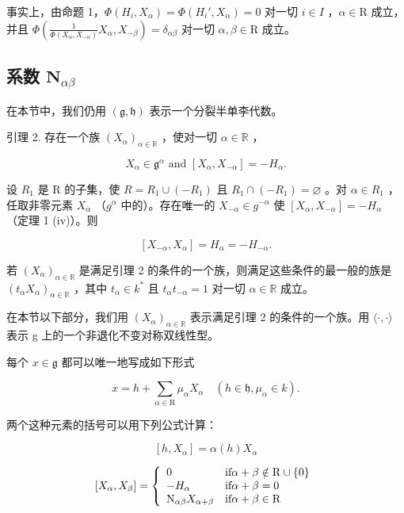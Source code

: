 事实上，由命题 1，\(\Phi(H_i, X_\alpha) = \Phi(H_i', X_\alpha) = 0\) 对一切 \(i \in I\) ，\(\alpha \in \mathrm{R}\) 成立，并且 \(\Phi\left(\frac{1}{\Phi(X_\alpha, X_{-\alpha})} X_\alpha, X_{-\beta}\right) = \delta_{\alpha\beta}\) 对一切 \(\alpha, \beta \in \mathrm{R}\) 成立。

\subsection{\texorpdfstring{系数 \(\mathbf{N}_{\alpha \beta}\)}{系数 \textbackslash mathbf\{N\}\_\{\textbackslash alpha \textbackslash beta\}}}

在本节中，我们仍用 \((\mathfrak{g},\mathfrak{h})\) 表示一个分裂半单李代数。

引理 2. 存在一个族 \((X_{\alpha})_{\alpha \in \mathbb{R}}\) ，使对一切 \(\alpha \in \mathbb{R}\) ，

\[
X _ {\alpha} \in \mathfrak {g} ^ {\alpha} \text { and } [ X _ {\alpha}, X _ {- \alpha} ] = - H _ {\alpha}.
\]

设 \(R_{1}\) 是 R 的子集，使 \(R = R_{1} \cup (-R_{1})\) 且 \(R_{1} \cap (-R_{1}) = \varnothing\) 。对 \(\alpha \in R_{1}\) ，任取非零元素 \(X_{\alpha}\) （\(g^{\alpha}\) 中的）。存在唯一的 \(X_{-\alpha} \in g^{-\alpha}\) 使 \([X_{\alpha}, X_{-\alpha}] = -H_{\alpha}\) （定理 1 (iv)）。则

\[
\left[ X _ {- \alpha}, X _ {\alpha} \right] = H _ {\alpha} = - H _ {- \alpha}.\tag{Q.E.D.}
\]

若 \((X_{\alpha})_{\alpha \in \mathbb{R}}\) 是满足引理 2 的条件的一个族，则满足这些条件的最一般的族是 \((t_{\alpha}X_{\alpha})_{\alpha \in \mathbb{R}}\) ，其中 \(t_{\alpha}\in k^{*}\) 且 \(t_{\alpha}t_{-\alpha} = 1\) 对一切 \(\alpha \in \mathbb{R}\) 成立。

在本节以下部分，我们用 \((X_{\alpha})_{\alpha\in\mathbb{R}}\) 表示满足引理 2 的条件的一个族。用 \(\langle\cdot,\cdot\rangle\) 表示 g 上的一个非退化不变对称双线性型。

每个 \(x \in \mathfrak{g}\) 都可以唯一地写成如下形式

\[
x = h + \sum_ {\alpha \in \mathrm{R}} \mu_ {\alpha} X _ {\alpha} \quad (h \in \mathfrak {h}, \mu_ {\alpha} \in k).
\]

两个这种元素的括号可以用下列公式计算：

\[
[ h, X _ {\alpha} ] = \alpha (h) X _ {\alpha}
\]

\[
[ X _ {\alpha}, X _ {\beta} ] = \left\{ \begin{array}{l l} 0 & \text {if} \alpha + \beta \notin \mathrm{R} \cup \{0 \} \\ - H _ {\alpha} & \text {if} \alpha + \beta = 0 \\ \mathrm{N} _ {\alpha \beta} X _ {\alpha + \beta} & \text {if} \alpha + \beta \in \mathrm{R} \end{array} \right.
\]

